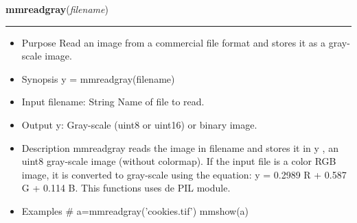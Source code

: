    \begin{boxedminipage}{\textwidth}

    \raggedright \textbf{mmreadgray}(\textit{filename})

    \vspace{-1.5ex}

    \rule{\textwidth}{0.5\fboxrule}
    \begin{itemize}
    \setlength{\parskip}{0.6ex}
      \item Purpose Read an image from a commercial file format and stores it 
        as a gray-scale image.

      \item Synopsis y = mmreadgray(filename)

      \item Input filename: String Name of file to read.

      \item Output y: Gray-scale (uint8 or uint16) or binary image.

      \item Description mmreadgray reads the image in filename and stores it 
        in y , an uint8 gray-scale image (without colormap). If the input 
        file is a color RGB image, it is converted to gray-scale using 
        the equation: y = 0.2989 R + 0.587 G + 0.114 B. This functions 
        uses de PIL module.

      \item Examples \# a=mmreadgray('cookies.tif') mmshow(a)

    \end{itemize}

    \vspace{1ex}

    \end{boxedminipage}

    \label{multireg:num_pymorph:mmregister}
    \vspace{0.5ex}

